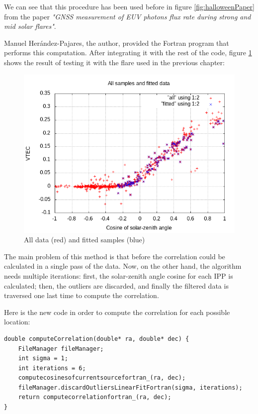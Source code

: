 We can see that this procedure has been used before in figure \ref{fig:halloweenPaper} from the paper \textit{"GNSS measurement of EUV photons flux rate during strong and mid solar flares"}\cite{hernandez2012gnss}.

Manuel Herández-Pajares, the author, provided the Fortran program that performs this computation. After integrating it with the rest of the code, figure \ref{fig:linearFit} shows the result of testing it with the flare used in the previous chapter:

\begin{figure}[!htb]
	\begin{centering}
	\includegraphics[width=0.5\linewidth]{images/ch6/linearFit/resultAll.png}
		\caption{All data (red) and fitted samples (blue)}
		\label{fig:linearFit}
	\end{centering}
\end{figure}

The main problem of this method is that before the correlation could be calculated in a single pass of the data. Now, on the other hand, the algorithm needs multiple iterations: first, the solar-zenith angle cosine for each IPP is calculated; then, the outliers are discarded, and finally the filtered data is traversed one last time to compute the correlation.

Here is the new code in order to compute the correlation for each possible location:

\begin{minipage}{\linewidth}
\begin{lstlisting}[style=myCStyle, caption=Discarding outliers and computing the correlation]
double computeCorrelation(double* ra, double* dec) {
	FileManager fileManager;
	int sigma = 1;
	int iterations = 6;
	computecosinesofcurrentsourcefortran_(ra, dec);
	fileManager.discardOutliersLinearFitFortran(sigma, iterations);	
	return computecorrelationfortran_(ra, dec);
}\end{lstlisting}
\end{minipage}


